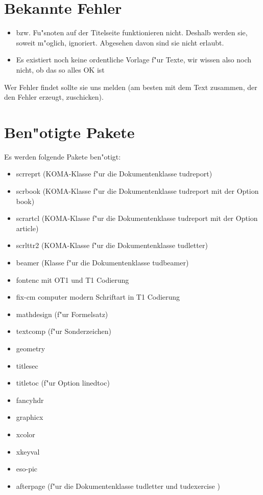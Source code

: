 \documentclass[twoside,colorback,accentcolor=tud4c,11pt]{tudreport}
\begin{document}
  \section{Bekannte Fehler}
 
   \begin{itemize}\itemsep-0.5ex
    \item {} bzw. Fu"snoten auf der Titelseite funktionieren
      nicht. Deshalb werden sie, soweit m"oglich, ignoriert.
      Abgesehen davon sind sie nicht erlaubt.
    \item Es existiert noch keine ordentliche Vorlage f"ur Texte, wir 
     wissen also noch nicht, ob das so alles OK ist
   \end{itemize}
   Wer Fehler findet sollte sie uns melden (am besten mit dem Text zusammen, der
   den Fehler erzeugt, zuschicken).

  \section{Ben"otigte Pakete}
    Es werden folgende Pakete ben"otigt:
   \begin{itemize}\itemsep-0.5ex
     \accentfont
     \item scrreprt   \textnormal{(KOMA-Klasse f"ur die Dokumentenklasse} tudreport\textnormal{)}
     \item scrbook    \textnormal{(KOMA-Klasse f"ur die Dokumentenklasse} tudreport \textnormal{mit der Option} book\textnormal{)}
     \item scrartcl   \textnormal{(KOMA-Klasse f"ur die Dokumentenklasse} tudreport \textnormal{mit der Option} article\textnormal{)}
     \item scrlttr2   \textnormal{(KOMA-Klasse f"ur die Dokumentenklasse} tudletter\textnormal{)}
     \item beamer     \textnormal{(Klasse f"ur die Dokumentenklasse} tudbeamer\textnormal{)}
     \item fontenc    \textnormal{mit} OT1 \textnormal{und} T1 \textnormal{Codierung}
     \item fix-cm     computer modern \textnormal{Schriftart in} T1 \textnormal{Codierung}
     \item mathdesign \textnormal{(f"ur Formelsatz)}
     \item textcomp   \textnormal{(f"ur Sonderzeichen)}
     \item geometry
     \item titlesec
     \item titletoc   \textnormal{(f"ur Option} linedtoc\textnormal{)}
     \item fancyhdr
     \item graphicx
     \item xcolor
     \item xkeyval
     \item eso-pic
     \item afterpage   \textnormal{(f"ur die Dokumentenklasse} tudletter \textnormal{und} tudexercise \textnormal{)}
   \end{itemize}
  
\end{document}
